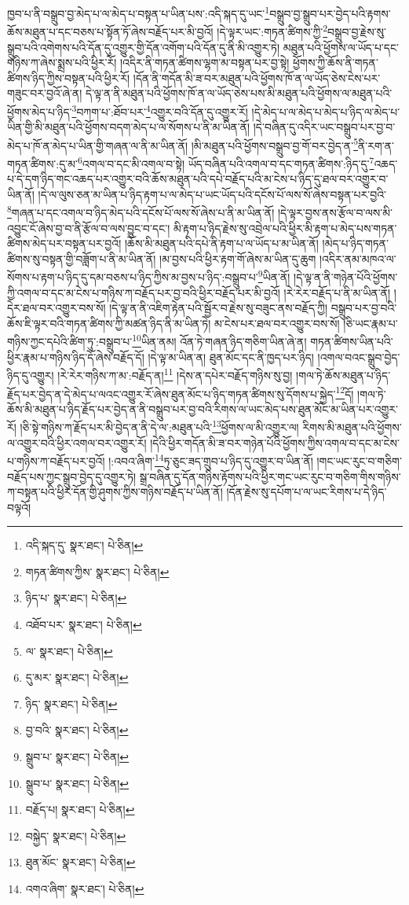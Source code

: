 ཁྱབ་པ་ནི་བསྒྲུབ་བྱ་མེད་པ་ལ་མེད་པ་བསྟན་པ་ཡིན་པས་:འདི་སྐད་དུ་ཡང་\footnote{འདི་སྐད་དུ་  སྣར་ཐང་།  པེ་ཅིན། }བསྒྲུབ་བྱ་སྒྲུབ་པར་བྱེད་པའི་རྟགས་ཆོས་མཐུན་པ་དང་བཅས་པ་སྟོན་ཏོ་ཞེས་བརྗོད་པར་མི་བྱའོ། །དེ་ལྟར་ཡང་:གཏན་ཚིགས་ཀྱི་\footnote{གཏན་ཚིགས་ཀྱིས་  སྣར་ཐང་།  པེ་ཅིན། }བསྒྲུབ་བྱ་རྗེས་སུ་སྒྲུབ་པའི་འགེགས་པའི་དོན་དུ་འགྱུར་གྱི་དོན་འགོག་པའི་དོན་དུ་ནི་མི་འགྱུར་ཏེ། མཐུན་པའི་ཕྱོགས་ལ་ཡོད་པ་དང་གཉིས་ཀ་ཞེས་སྨྲས་པའི་ཕྱིར་རོ། །འདིར་ནི་གཏན་ཚིགས་ལྷག་མ་བསྟན་པར་བྱ་སྟེ། ཕྱོགས་ཀྱི་ཆོས་ནི་གཏན་ཚིགས་ཉིད་ཀྱིས་བསྟན་པའི་ཕྱིར་རོ། །དོན་ནི་གདོན་མི་ཟ་བར་མཐུན་པའི་ཕྱོགས་ཁོ་ན་ལ་ཡོད་ཅེས་ངེས་པར་གཟུང་བར་བྱའོ་ཞེ་ན། དེ་ལྟ་ན་ནི་མཐུན་པའི་ཕྱོགས་ཁོ་ན་ལ་ཡོད་ཅེས་པས་མི་མཐུན་པའི་ཕྱོགས་ལ་མཐུན་པའི་ཕྱོགས་མེད་པ་ཉིད་\footnote{ཉིད་པ་  སྣར་ཐང་།  པེ་ཅིན། }བཀག་པ་:ཐོབ་པར་\footnote{འཐོབ་པར་  སྣར་ཐང་།  པེ་ཅིན། }འགྱུར་བའི་དོན་དུ་འགྱུར་རོ། །དེ་མེད་པ་ལ་མེད་པ་མེད་པ་ཉིད་ལ་མེད་པ་ཡིན་གྱི་མི་མཐུན་པའི་ཕྱོགས་བདག་མེད་པ་ལ་སོགས་པ་ནི་མ་ཡིན་ནོ། །དེ་བཞིན་དུ་འདིར་ཡང་བསྒྲུབ་པར་བྱ་བ་མེད་པ་ཁོ་ན་མེད་པ་ཡིན་གྱི་གཞན་ལ་ནི་མ་ཡིན་ནོ། །མི་མཐུན་པའི་ཕྱོགས་བསྒྲུབ་བྱ་གོ་བར་བྱེད་ན་\footnote{ལ་  སྣར་ཐང་།  པེ་ཅིན། }ནི་རག་ན་གཏན་ཚིགས་:དུ་མ་\footnote{དུ་མར་  སྣར་ཐང་།  པེ་ཅིན། }འགལ་བ་དང་མི་འགལ་བ་སྟེ། ཡོད་བཞིན་པའི་འགལ་བ་དང་གཏན་ཚིགས་:ཉིད་དུ་\footnote{ཉིད་  སྣར་ཐང་།  པེ་ཅིན། }འཆད་པ་དེ་དག་ཉིད་གང་འཆད་པར་འགྱུར་བའི་ཆོས་མཐུན་པའི་དཔེ་བརྗོད་པའི་མ་ངེས་པ་ཉིད་དུ་ཐལ་བར་འགྱུར་བ་ཡིན་ནོ། །དེ་ལ་ལུས་ཅན་མ་ཡིན་པ་ཉིད་རྟག་པ་ལ་མེད་པ་ཡང་ཡོད་པའི་དངོས་པོ་ལས་སོ་ཞེས་བསྟན་པར་བྱའི་\footnote{བྱ་བའི་  སྣར་ཐང་།  པེ་ཅིན། }གཞན་པ་དང་འགལ་བ་ཉིད་མེད་པའི་དངོས་པོ་ལས་སོ་ཞེས་པ་ནི་མ་ཡིན་ནོ། །དེ་ལྟར་བྱས་ནས་རྩོལ་བ་ལས་མི་འབྱུང་ངོ་ཞེས་བྱ་བ་ནི་རྩོལ་བ་ལས་བྱུང་བ་དང་། མི་རྟག་པ་ཉིད་རྗེས་སུ་འབྲེལ་པའི་ཕྱིར་མི་རྟག་པ་མེད་པས་གཏན་ཚིགས་མེད་པར་བསྟན་པར་བྱའོ། །ཆོས་མི་མཐུན་པའི་དཔེ་ནི་རྟག་པ་ལ་ཡོད་པ་མ་ཡིན་ནོ། །མེད་པ་ཉིད་གཏན་ཚིགས་སུ་བསྟན་གྱི་བཟློག་པ་ནི་མ་ཡིན་ནོ། །མ་བྱས་པའི་ཕྱིར་རྟག་གོ་ཞེས་མ་ཡིན་དུ་ཆུག །འདིར་ནམ་མཁའ་ལ་སོགས་པ་རྟག་པ་ཉིད་དུ་དམ་བཅས་པ་ཉིད་ཀྱིས་མ་བྱས་པ་ཉིད་:བསྒྲུབ་པ་\footnote{སྒྲུབ་པ་  སྣར་ཐང་།  པེ་ཅིན། }ཡིན་ནོ། །དེ་ལྟ་ན་ནི་གཉེན་པོའི་ཕྱོགས་ཀྱི་འགལ་བ་དང་མ་ངེས་པ་གཉིས་ཀ་བརྗོད་པར་བྱ་བའི་ཕྱིར་བརྗོད་པར་མི་བྱའོ། །རེ་རེར་བརྗོད་པ་ནི་མ་ཡིན་ནོ། །དེར་ཐལ་བར་འགྱུར་བས་སོ། །དེ་ལྟ་ན་ནི་འཇིག་རྟེན་པའི་སྦྱོར་བ་རྗེས་སུ་བཟུང་ནས་བརྗོད་ཀྱི། བསྒྲུབ་པར་བྱ་བའི་ཆོས་ཇི་ལྟར་བའི་གཏན་ཚིགས་ཀྱི་མཚན་ཉིད་ནི་མ་ཡིན་ཏེ། མ་ངེས་པར་ཐལ་བར་འགྱུར་བས་སོ། །ཅི་ཡང་རྣམ་པ་གཉིས་ཀྱང་དཔེའི་ཚིག་ཏུ་:བསྒྲུབ་པ་\footnote{སྒྲུབ་པ་  སྣར་ཐང་།  པེ་ཅིན། }ཡིན་ནམ། འོན་ཏེ་གཞན་ཉིད་གཅིག་ཡིན་ཞེ་ན། གཏན་ཚིགས་ཡིན་པའི་ཕྱིར་རྣམ་པ་གཉིས་ཉིད་དོ་ཞེས་བརྗོད་དོ། །དེ་ལྟ་མ་ཡིན་ན། ཐུན་མོང་དང་ནི་ཁྱད་པར་ཉིད། །འགལ་བའང་སྒྲུབ་བྱེད་ཉིད་དུ་འགྱུར། །རེ་རེར་གཉིས་ཀ་མ་:བརྗོད་ན།\footnote{བརྗོད་པ།  སྣར་ཐང་།  པེ་ཅིན། } །དེས་ན་དཔེར་བརྗོད་གཉིས་སུ་བྱ། །གལ་ཏེ་ཆོས་མཐུན་པ་ཉིད་རྗོད་པར་བྱེད་ན་དེ་མེད་པ་ལའང་འགྱུར་རོ་ཞེས་ཐུན་མོང་པ་ཉིད་གཏན་ཚིགས་སུ་དོགས་པ་སྐྱེད་\footnote{བསྐྱེད་  སྣར་ཐང་།  པེ་ཅིན། }དོ། །གལ་ཏེ་ཆོས་མི་མཐུན་པ་ཉིད་རྗོད་པར་བྱེད་ན་ནི་བསྒྲུབ་པར་བྱ་བའི་རིགས་ལ་ཡང་མེད་པས་ཐུན་མོང་མ་ཡིན་པར་འགྱུར་རོ། །ཅི་སྟེ་གཉིས་ཀ་རྗོད་པར་མི་བྱེད་ན་ནི་དེ་ལ་:མཐུན་པའི་\footnote{ཐུན་མོང་  སྣར་ཐང་།  པེ་ཅིན། }ཕྱོགས་ལ་མི་འགྱུར་ལ། རིགས་མི་མཐུན་པའི་ཕྱོགས་ལ་འགྱུར་བའི་ཕྱིར་འགལ་བར་འགྱུར་རོ། །དེའི་ཕྱིར་གདོན་མི་ཟ་བར་གཉེན་པོའི་ཕྱོགས་ཀྱིས་འགལ་བ་དང་མ་ངེས་པ་གཉིས་ཀ་བརྗོད་པར་བྱའོ། །:འབའ་ཞིག་\footnote{འགའ་ཞིག་  སྣར་ཐང་།  པེ་ཅིན། }ཏུ་ཅུང་ཟད་གྲུབ་པ་ཉིད་དུ་འགྱུར་བ་ཡིན་ནོ། །གང་ཡང་རུང་བ་གཅིག་བརྗོད་པས་ཀྱང་སྒྲུབ་བྱེད་དུ་འགྱུར་ཏེ། སྒྲ་བཞིན་དུ་དོན་གཉིས་རྟོགས་པའི་ཕྱིར་གང་ཡང་རུང་བ་གཅིག་གིས་གཉིས་ཀ་བསྟན་པའི་ཕྱིར་དོན་གྱི་ཤུགས་ཀྱིས་གཉིས་བརྗོད་པ་ཡིན་ནོ། །དོན་རྗེས་སུ་དཔོག་པ་ལ་ཡང་རིགས་པ་དེ་ཉིད་བལྟའོ། 